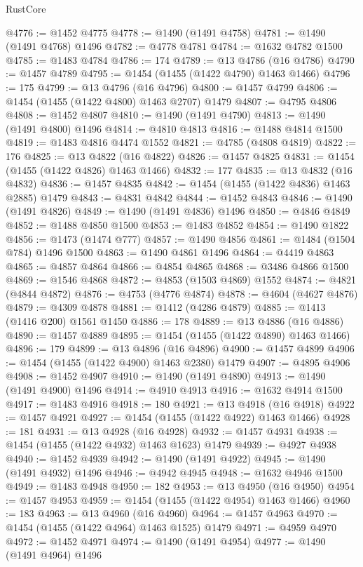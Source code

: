 \begin{lexlean}{RustCore}
\begin{coremodule}
@4776 := @1452 @4775
@4778 := @1490 (@1491 @4758)
@4781 := @1490 (@1491 @4768) @1496
@4782 := @4778 @4781
@4784 := @1632 @4782 @1500
@4785 := @1483 @4784
@4786 := 174
@4789 := @13 @4786 (@16 @4786)
@4790 := @1457 @4789
@4795 := @1454 (@1455 (@1422 @4790) @1463 @1466)
@4796 := 175
@4799 := @13 @4796 (@16 @4796)
@4800 := @1457 @4799
@4806 := @1454 (@1455 (@1422 @4800) @1463 @2707) @1479
@4807 := @4795 @4806
@4808 := @1452 @4807
@4810 := @1490 (@1491 @4790)
@4813 := @1490 (@1491 @4800) @1496
@4814 := @4810 @4813
@4816 := @1488 @4814 @1500
@4819 := @1483 @4816 @4474 @1552
@4821 := @4785 (@4808 @4819)
@4822 := 176
@4825 := @13 @4822 (@16 @4822)
@4826 := @1457 @4825
@4831 := @1454 (@1455 (@1422 @4826) @1463 @1466)
@4832 := 177
@4835 := @13 @4832 (@16 @4832)
@4836 := @1457 @4835
@4842 := @1454 (@1455 (@1422 @4836) @1463 @2885) @1479
@4843 := @4831 @4842
@4844 := @1452 @4843
@4846 := @1490 (@1491 @4826)
@4849 := @1490 (@1491 @4836) @1496
@4850 := @4846 @4849
@4852 := @1488 @4850 @1500
@4853 := @1483 @4852
@4854 := @1490 @1822
@4856 := @1473 (@1474 @777)
@4857 := @1490 @4856
@4861 := @1484 (@1504 @784) @1496 @1500
@4863 := @1490 @4861 @1496
@4864 := @4419 @4863
@4865 := @4857 @4864
@4866 := @4854 @4865
@4868 := @3486 @4866 @1500
@4869 := @1546 @4868
@4872 := @4853 (@1503 @4869) @1552
@4874 := @4821 (@4844 @4872)
@4876 := @4753 (@4776 @4874)
@4878 := @4604 (@4627 @4876)
@4879 := @4309 @4878
@4881 := @1412 (@4286 @4879)
@4885 := @1413 (@1416 @200) @1561 @1450
@4886 := 178
@4889 := @13 @4886 (@16 @4886)
@4890 := @1457 @4889
@4895 := @1454 (@1455 (@1422 @4890) @1463 @1466)
@4896 := 179
@4899 := @13 @4896 (@16 @4896)
@4900 := @1457 @4899
@4906 := @1454 (@1455 (@1422 @4900) @1463 @2380) @1479
@4907 := @4895 @4906
@4908 := @1452 @4907
@4910 := @1490 (@1491 @4890)
@4913 := @1490 (@1491 @4900) @1496
@4914 := @4910 @4913
@4916 := @1632 @4914 @1500
@4917 := @1483 @4916
@4918 := 180
@4921 := @13 @4918 (@16 @4918)
@4922 := @1457 @4921
@4927 := @1454 (@1455 (@1422 @4922) @1463 @1466)
@4928 := 181
@4931 := @13 @4928 (@16 @4928)
@4932 := @1457 @4931
@4938 := @1454 (@1455 (@1422 @4932) @1463 @1623) @1479
@4939 := @4927 @4938
@4940 := @1452 @4939
@4942 := @1490 (@1491 @4922)
@4945 := @1490 (@1491 @4932) @1496
@4946 := @4942 @4945
@4948 := @1632 @4946 @1500
@4949 := @1483 @4948
@4950 := 182
@4953 := @13 @4950 (@16 @4950)
@4954 := @1457 @4953
@4959 := @1454 (@1455 (@1422 @4954) @1463 @1466)
@4960 := 183
@4963 := @13 @4960 (@16 @4960)
@4964 := @1457 @4963
@4970 := @1454 (@1455 (@1422 @4964) @1463 @1525) @1479
@4971 := @4959 @4970
@4972 := @1452 @4971
@4974 := @1490 (@1491 @4954)
@4977 := @1490 (@1491 @4964) @1496

\end{coremodule}
\end{lexlean}

